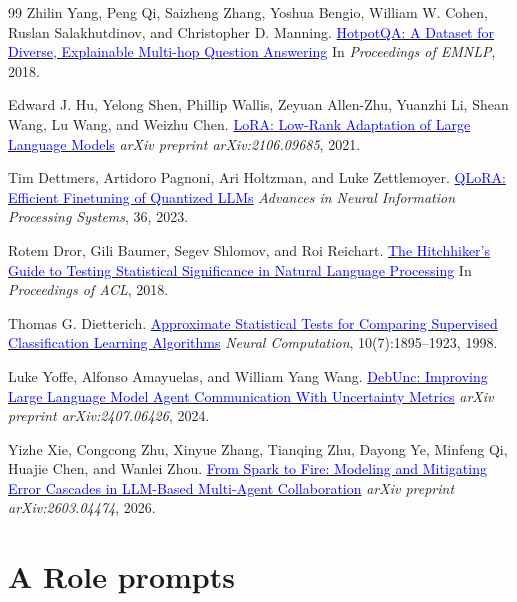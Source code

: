 \documentclass{article}
\begin{document}
\begin{thebibliography}{99}
Zhilin Yang, Peng Qi, Saizheng Zhang, Yoshua Bengio, William W. Cohen,
Ruslan Salakhutdinov, and Christopher D. Manning.
\href{https://arxiv.org/abs/1809.09600}{\textcolor{blue}{{HotpotQA}: A Dataset for Diverse, Explainable Multi-hop Question Answering}}
In \textit{Proceedings of EMNLP}, 2018.

Edward J. Hu, Yelong Shen, Phillip Wallis, Zeyuan Allen-Zhu, Yuanzhi Li,
Shean Wang, Lu Wang, and Weizhu Chen.
\href{https://arxiv.org/abs/2106.09685}{\textcolor{blue}{{LoRA}: Low-Rank Adaptation of Large Language Models}}
\textit{arXiv preprint arXiv:2106.09685}, 2021.

Tim Dettmers, Artidoro Pagnoni, Ari Holtzman, and Luke Zettlemoyer.
\href{https://arxiv.org/abs/2305.14314}{\textcolor{blue}{{QLoRA}: Efficient Finetuning of Quantized {LLMs}}}
\textit{Advances in Neural Information Processing Systems}, 36, 2023.

Rotem Dror, Gili Baumer, Segev Shlomov, and Roi Reichart.
\href{https://aclanthology.org/P18-1128/}{\textcolor{blue}{The Hitchhiker's Guide to Testing Statistical Significance in Natural Language Processing}}
In \textit{Proceedings of ACL}, 2018.

Thomas G. Dietterich.
\href{https://doi.org/10.1162/089976698300017197}{\textcolor{blue}{Approximate Statistical Tests for Comparing Supervised Classification Learning Algorithms}}
\textit{Neural Computation}, 10(7):1895--1923, 1998.

Luke Yoffe, Alfonso Amayuelas, and William Yang Wang.
\href{https://arxiv.org/abs/2407.06426}{\textcolor{blue}{{DebUnc}: Improving Large Language Model Agent Communication With Uncertainty Metrics}}
\textit{arXiv preprint arXiv:2407.06426}, 2024.

Yizhe Xie, Congcong Zhu, Xinyue Zhang, Tianqing Zhu, Dayong Ye,
Minfeng Qi, Huajie Chen, and Wanlei Zhou.
\href{https://arxiv.org/abs/2603.04474}{\textcolor{blue}{From Spark to Fire: Modeling and Mitigating Error Cascades in {LLM}-Based Multi-Agent Collaboration}}
\textit{arXiv preprint arXiv:2603.04474}, 2026.

\end{thebibliography}

\appendix
\renewcommand{\thesection}{\Alph{section}}

\section*{A \quad Role prompts}
\end{document}
